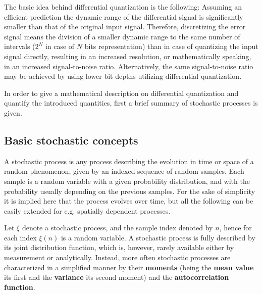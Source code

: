 The basic idea behind differential quantization is the following:
Assuming an efficient prediction the dynamic range of the differential signal is significantly smaller than that of the original input signal.
Therefore, discretizing the error signal means the division of a smaller dynamic range to the same number of intervals ($2^N$ in case of $N$ bits representation) than in case of quantizing the input signal directly, resulting in an increased resolution, or mathematically speaking, in an increased signal-to-noise ratio.
Alternatively, the same signal-to-noise ratio may be achieved by using lower bit depths utilizing differential quantization.

\vspace{3mm}
In order to give a mathematical description on differential quantization and quantify the introduced quantities, first a brief summary of stochastic processes is given.

\subsection{Basic stochastic concepts}

A stochastic process is any process describing the evolution in time or space of a random phenomenon, given by an indexed sequence of random samples.
Each sample is a random variable with a given probability distribution, and with the probability usually depending on the previous samples.
For the sake of simplicity it is implied here that the process evolves over time, but all the following can be easily extended for e.g. spatially dependent processes.

Let $\xi$ denote a stochastic process, and the sample index denoted by $n$, hence for each index $\xi(n)$ is a random variable.
A stochastic process is fully described by its joint distribution function,  which is, however, rarely available either by measurement or analytically.
Instead, more often stochastic processes are characterized in a simplified manner by their \textbf{moments} (being the \textbf{mean value} its first and the \textbf{variance} its second moment) and the \textbf{autocorrelation function}.

